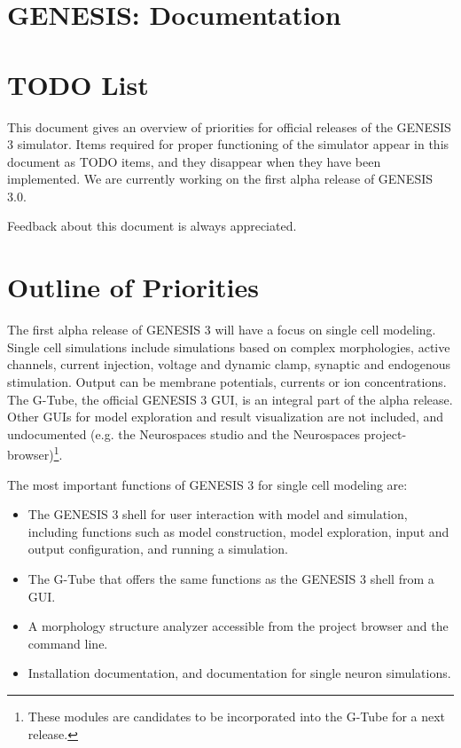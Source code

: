 \documentclass[12pt]{article}
\begin{document}
\section*{GENESIS: Documentation}

\section*{TODO List}

This document gives an overview of priorities for official releases of
the GENESIS 3 simulator.  Items required for proper functioning of the
simulator appear in this document as TODO items, and they disappear
when they have been implemented.  We are currently working on the
first alpha release of GENESIS 3.0.

Feedback about this document is always appreciated.


\section{Outline of Priorities}

The first alpha release of GENESIS 3 will have a focus on single cell
modeling.  Single cell simulations include simulations based on
complex morphologies, active channels, current injection, voltage and
dynamic clamp, synaptic and endogenous stimulation.  Output can be
membrane potentials, currents or ion concentrations.  The G-Tube, the
official GENESIS 3 GUI, is an integral part of the alpha release.
Other GUIs for model exploration and result visualization are not
included, and undocumented (e.g. the Neurospaces studio and the
Neurospaces project-browser)\footnote{These modules are candidates to
  be incorporated into the G-Tube for a next release.}.

The most important functions of GENESIS 3 for single cell modeling
are:

\begin{itemize}
\item The GENESIS 3 shell for user interaction with model and
  simulation, including functions such as model construction, model
  exploration, input and output configuration, and running a
  simulation.
\item The G-Tube that offers the same functions as the GENESIS 3 shell
  from a GUI.
\item A morphology structure analyzer accessible from the project
  browser and the command line.
\item Installation documentation, and documentation for single neuron
  simulations.
\end{itemize}
\end{document}
